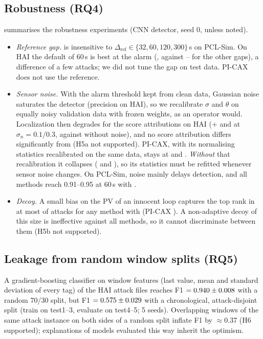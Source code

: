 \subsection{Robustness (RQ4)}\label{sec:ablation}
 summarises the robustness experiments (CNN detector, seed 0, unless noted).
\begin{itemize}
\item \emph{Reference gap.} \LX{} is insensitive to $\Delta_{\mathrm{ref}}\in\{32,60,120,300\}$\,s on PCL-Sim. On HAI the default of 60\,s is best at the alarm (\ptwohairefBLXsingleZerohrOne, against \ptwohairefDLXsingleZerohrOne--\ptwohairefCLXsingleZerohrOne{} for the other gaps), a difference of a few attacks; we did not tune the gap on test data. PI-CAX does not use the reference.
\item \emph{Sensor noise.} With the alarm threshold kept from clean data, Gaussian noise saturates the detector (precision \ptwohainoiseAcleandetprecision{} on HAI), so we recalibrate $\sigma$ and $\theta$ on equally noisy validation data with frozen weights, as an operator would. Localization then degrades for the score attributions on HAI (\LX+\TEA{} \ptwohainoiseALXteaSixZerohrOne{} and \ptwohainoiseBLXteaSixZerohrOne{} at $\sigma_n=0.1/0.3$, against \ptwohairefBLXteaSixZerohrOne{} without noise), and no score attribution differs significantly from \LX{} (H5a not supported). PI-CAX, with its normalising statistics recalibrated on the same data, stays at \ptwohainoiseAPICAXteaSixZerohrOne{} and \ptwohainoiseBPICAXteaSixZerohrOne. \emph{Without} that recalibration it collapses (\pcfrozenhaiAtea{} and \pcfrozenhaiBtea), so its statistics must be refitted whenever sensor noise changes. On PCL-Sim, noise mainly delays detection, and all methods reach 0.91--0.95 at 60\,s with \TEA.
\item \emph{Decoy.} A small bias on the PV of an innocent loop captures the top rank in at most \ptwosimdecoyLXteaSixZerodecoytopOne{} of attacks for any method with \TEA{} (PI-CAX \ptwosimdecoyPICAXteaSixZerodecoytopOne). A non-adaptive decoy of this size is ineffective against all methods, so it cannot discriminate between them (H5b not supported).
\end{itemize}



\subsection{Leakage from random window splits (RQ5)}
A gradient-boosting classifier on window features (last value, mean and standard deviation of every tag) of the HAI attack files reaches F1 $=0.940\pm0.008$ with a random 70/30 split, but F1 $=0.575\pm0.029$ with a chronological, attack-disjoint split (train on test1--3, evaluate on test4--5; 5 seeds). Overlapping windows of the same attack instance on both sides of a random split inflate F1 by $\approx$0.37 (H6 supported); explanations of models evaluated this way inherit the optimism.

